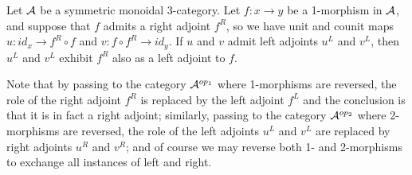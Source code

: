 \documentclass{amsart}
\begin{document}
\begin{lemma} \label{lem-ambiadjoints}
	Let $\mathcal A$ be a symmetric monoidal 3-category. Let $f: x \to y$ be a 1-morphism in $\mathcal A$, and suppose that $f$ admits a right adjoint $f^R$,  so we have unit and counit maps $u:id_x \to f^R \circ f$ and $v:f \circ f^R \to id_y$. If $u$ and $v$ admit left adjoints $u^L$ and $v^L$, then $u^L$ and $v^L$ exhibit $f^R$ also as a left adjoint to $f$. 
\end{lemma}
\noindent Note that by passing to the category $\mathcal A^{op_1}$ where 1-morphisms are reversed, the role of the right adjoint $f^R$ is replaced by the left adjoint $f^L$ and the conclusion is that it is in fact a right adjoint; similarly, passing to the category $\mathcal A^{op_2}$ where 2-morphisms are reversed, the role of the left adjoints $u^L$ and $v^L$ are replaced by right adjoints $u^R$ and $v^R$; and of course we may reverse both 1- and 2-morphisms to exchange all instances of left and right.
\end{document}
